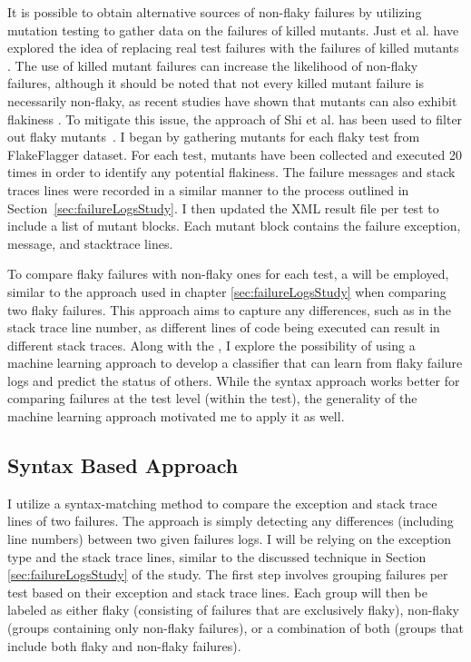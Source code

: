 It is possible to obtain alternative sources of non-flaky failures by utilizing mutation testing to gather data on the failures of killed mutants. Just et al. have explored the idea of replacing real test failures with the failures of killed mutants \cite{just2014mutants}. The use of killed mutant failures can increase the likelihood of non-flaky failures, although it should be noted that not every killed mutant failure is necessarily non-flaky, as recent studies have shown that mutants can also exhibit flakiness \cite{shi2019mitigating}. To mitigate this issue, the approach of
Shi et al. has been used to filter out flaky mutants~\cite{shi2019mitigating}. I began by gathering mutants for each flaky test from FlakeFlagger dataset. For each test, mutants have been collected and executed 20 times in order to identify any potential flakiness. The failure messages and stack traces lines were recorded in a similar manner to the process outlined in Section~\ref{sec:failureLogsStudy}. I then updated the XML result file per test to include a list of mutant blocks. Each mutant block contains the failure exception, message, and stacktrace lines. 

To compare flaky failures with non-flaky ones for each test, a \syntax will be employed, similar to the approach used in chapter \ref{sec:failureLogsStudy} when comparing two flaky failures. This approach aims to capture any differences, such as in the stack trace line number, as different lines of code being executed can result in different stack traces. Along with the \syntax, I explore the possibility of using a machine learning approach to develop a classifier that can learn from flaky failure logs and predict the status of others. While the syntax approach works better for comparing failures at the test level (within the test), the generality of the machine learning approach motivated me to apply it as well.


\subsection{Syntax Based Approach}

I utilize a syntax-matching method to compare the exception and stack trace lines of two failures. The approach is simply detecting any differences (including line numbers) between two given failures logs. I will be relying on the exception type and the stack trace lines, similar to the discussed technique in Section \ref{sec:failureLogsStudy} of the study. The first step involves grouping failures per test based on their exception and stack trace lines. Each group will then be labeled as either flaky (consisting of failures that are exclusively flaky), non-flaky (groups containing only non-flaky failures), or a combination of both (groups that include both flaky and non-flaky failures). 

